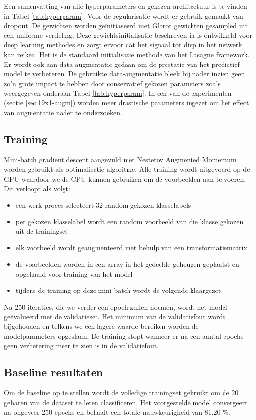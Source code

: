 \npar Een samenvatting van alle hyperparameters en gekozen architectuur is te vinden in Tabel \ref{tab:hyperparam}. Voor de regularisatie wordt er gebruik gemaakt van dropout. De gewichten worden ge\"initiaseerd met Glorot gewichten gesampled uit een uniforme verdeling. Deze gewichtsinitialisatie beschreven in \cite{glorot-1} is ontwikkeld voor deep learning methodes en zorgt ervoor dat het signaal tot diep in het netwerk kan reiken. Het is de standaard initialisatie methode van het Lasagne framework.
\npar Er wordt ook aan data-augmentatie gedaan om de prestatie van het predictief model te verbeteren. De gebruikte data-augmentatie bleek bij nader inzien geen zo'n grote impact te hebben door conservatief gekozen parameters zoals weergegeven onderaan Tabel \ref{tab:hyperparam}. In een van de experimenten (sectie \ref{sec:19x1-augm}) worden meer drastische parameters ingezet om het effect van augmentatie nader te onderzoeken.
\subsection{Training}
\npar Mini-batch gradient descent aangevuld met Nesterov Augmented Momentum worden gebruikt als optimalisatie-algoritme. Alle training wordt uitgevoerd op de GPU waardoor we de CPU kunnen gebruiken om de voorbeelden aan te voeren. Dit verloopt als volgt:
\begin{itemize}
	\item een werk-proces selecteert 32 random gekozen klasselabels
	\item per gekozen klasselabel wordt een random voorbeeld van die klasse gekozen uit de trainingset
	\item elk voorbeeld wordt geaugmenteerd met behulp van een transformatiematrix
	\item de voorbeelden worden in een array in het gedeelde geheugen geplaatst en opgehaald voor training van het model
	\item tijdens de training op deze mini-batch wordt de volgende klaargezet
\end{itemize}
Na 250 iteraties, die we verder een epoch zullen noemen, wordt het model ge\"evalueerd met de validatieset. Het minimum van de validatiefout wordt bijgehouden en telkens we een lagere waarde bereiken worden de modelparameters opgeslaan. De training stopt wanneer er na een aantal epochs geen verbetering meer te zien is in de validatiefout.

\subsection{Baseline resultaten}
Om de baseline op te stellen wordt de volledige trainingset gebruikt om de 20 gebaren van de dataset te leren classificeren. Het voorgestelde model convergeert na ongeveer 250 epochs en behaalt een totale nauwkeurigheid van 81,20 \%.

